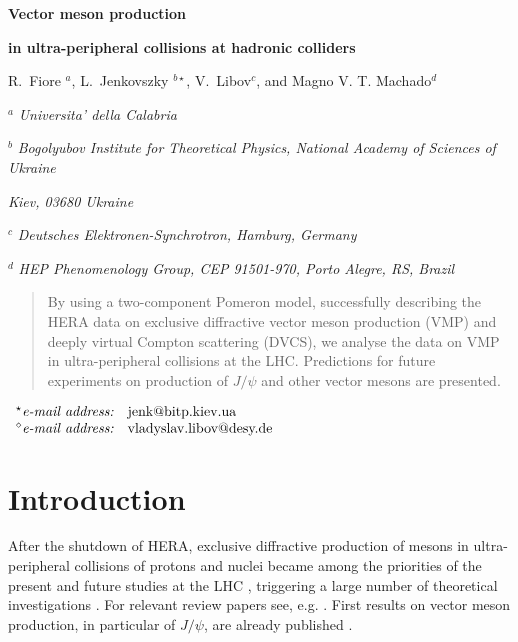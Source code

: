 \documentclass[12pt]{article}
\begin{document}
\vskip 0.5cm \centerline{\bf\Large Vector meson production}
\centerline{\bf\Large in ultra-peripheral collisions at hadronic colliders}  \vskip 0.3cm
\centerline{R.~Fiore $^a$, L.~Jenkovszky $^{b\star}$, V.~Libov$^c$, and Magno V. T. Machado$^d$}

\vskip 1cm

\centerline{$^a$ \sl Universita' della Calabria}
\centerline{$^b$ \sl Bogolyubov Institute for Theoretical Physics,
National Academy of Sciences of Ukraine} \centerline{\sl Kiev,
03680 Ukraine} 
\centerline{$^c$ \sl Deutsches Elektronen-Synchrotron, Hamburg, Germany}
\centerline{$^d$ \sl HEP Phenomenology Group, CEP 91501-970, Porto Alegre, RS, Brazil
}
\vskip
0.1cm

\begin{abstract}\noindent
By using a two-component Pomeron model, successfully describing the HERA data on exclusive diffractive vector meson production (VMP) and deeply virtual Compton scattering (DVCS), we analyse the data on VMP in ultra-peripheral collisions at the LHC.
Predictions for future experiments on production of $J/\psi$ and other vector mesons are presented.
\end{abstract}

\vskip 0.1cm

$
\begin{array}{ll}

^{\star}\mbox{{\it e-mail address:}} &
   \mbox{jenk@bitp.kiev.ua} \\
^{\diamond}\mbox{{\it e-mail address:}} &
   \mbox{vladyslav.libov@desy.de} \\

\end{array}
$


\section{Introduction}\label{Int}

After the shutdown of HERA, exclusive diffractive production of mesons in ultra-peripheral collisions of protons and nuclei became among the priorities of the present and future studies at the LHC \cite{LHCb1, LHCb2}, triggering a large number of theoretical investigations \cite{Schafer, Brazil, Ryskin, Motyka, Szczurek}.
For relevant review papers see, e.g. \cite{Review}.
First results on vector meson production, in particular of $J/\psi$, are already published \cite{LHCb1, LHCb2}.
\end{document}
